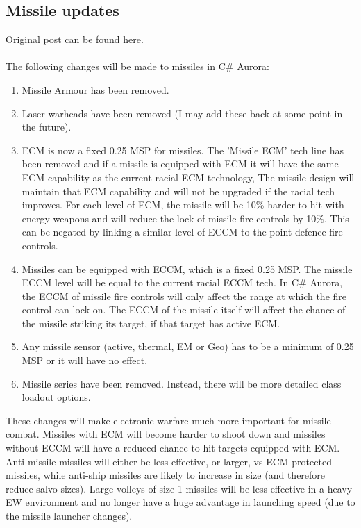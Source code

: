 \documentclass[../Aurora C# unofficial manual.tex]{subfiles}
\begin{document}
	\subsection{Missile updates}
	Original post can be found
	\href{http://aurora2.pentarch.org/index.php?topic=8495.msg103096#msg103096}{here}.
	\\\\
	
	The following changes will be made to missiles in C\# Aurora:
	\begin{enumerate}
		\item Missile Armour has been removed.
		\item Laser warheads have been removed (I may add these back at some point in the future).
		\item ECM is now a fixed 0.25 MSP for missiles. The 'Missile ECM' tech line has been removed and if a missile is equipped with ECM it will have the same ECM capability as the current racial ECM technology, The missile design will maintain that ECM capability and will not be upgraded if the racial tech improves. For each level of ECM, the missile will be 10\% harder to hit with energy weapons and will reduce the lock of missile fire controls by 10\%. This can be negated by linking a similar level of ECCM to the point defence fire controls.
		\item Missiles can be equipped with ECCM, which is a fixed 0.25 MSP. The missile ECCM level will be equal to the current racial ECCM tech. In C\# Aurora, the ECCM of missile fire controls will only affect the range at which the fire control can lock on. The ECCM of the missile itself will affect the chance of the missile striking its target, if that target has active ECM.
		\item Any missile sensor (active, thermal, EM or Geo) has to be a minimum of 0.25 MSP or it will have no effect.
		\item Missile series have been removed. Instead, there will be more detailed class loadout options.
	\end{enumerate}

	These changes will make electronic warfare much more important for missile combat. Missiles with ECM will become harder to shoot down and missiles without ECCM will have a reduced chance to hit targets equipped with ECM. Anti-missile missiles will either be less effective, or larger, vs ECM-protected missiles, while anti-ship missiles are likely to increase in size (and therefore reduce salvo sizes). Large volleys of size-1 missiles will be less effective in a heavy EW environment and no longer have a huge advantage in launching speed (due to the missile launcher changes).
\end{document}
